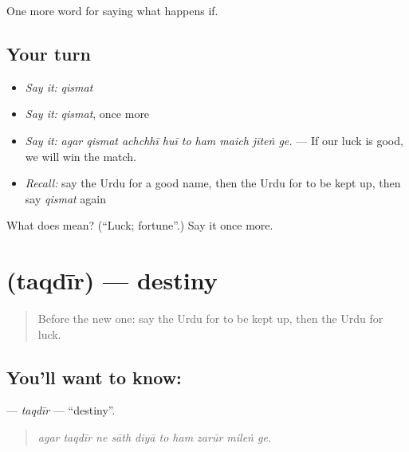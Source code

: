 \begin{grammarlens}[title={What you've built}]
One more word for saying what happens if.
\end{grammarlens}

\subsection*{Your turn}
\begin{itemize}
\raggedright
  \item \emph{Say it:} \emph{qismat}
  \item \emph{Say it:} \emph{qismat}, once more
  \item \emph{Say it:} \emph{agar qismat achchhī huī to ham maich jīteṅ ge.} — If our luck is good, we will win the match.
  \item \emph{Recall:} say the Urdu for a good name, then the Urdu for to be kept up, then say \emph{qismat} again
\end{itemize}

\begin{tcolorbox}[breakable,colback=teal!4,colframe=teal!35!black,title={Before you move on}]
What does  mean? (\textquotedblleft{}Luck; fortune\textquotedblright{}.) Say it once more.
\end{tcolorbox}
\section[\texorpdfstring{\ur{تقدیر} (taqdīr)}{تقدیر (taqdīr)}]{ (taqdīr) — destiny}

\label{lesson:UR-C532-taqdir}



\begin{quote}
Before the new one: say the Urdu for to be kept up, then the Urdu for luck.
\end{quote}

\subsection*{You'll want to know: }
\textbf{} — \emph{taqdīr} — \textquotedblleft{}destiny\textquotedblright{}.

\begin{quote}
         
\end{quote}

\begin{quote}
\emph{agar taqdīr ne sāth diyā to ham zarūr mileṅ ge.}
\end{quote}

